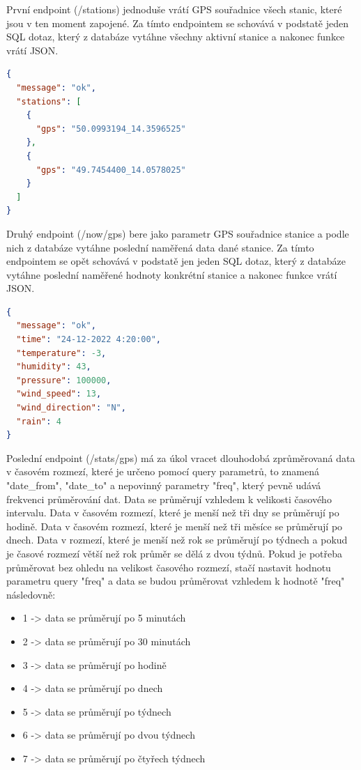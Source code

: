 První endpoint (/stations) jednoduše vrátí GPS souřadnice všech stanic, které jsou v ten moment zapojené.
Za tímto endpointem se schovává v podstatě jeden SQL dotaz, který z databáze vytáhne všechny aktivní stanice a nakonec funkce vrátí JSON.
\begin{lstlisting}[language=json,firstnumber=1, caption=Příklad požadavku /stations]
{
  "message": "ok",
  "stations": [
    {
      "gps": "50.0993194_14.3596525"
    },
    {
      "gps": "49.7454400_14.0578025"
    }
  ]
}
\end{lstlisting}
Druhý endpoint (/now/{gps}) bere jako parametr GPS souřadnice stanice a podle nich z databáze vytáhne poslední naměřená data dané stanice.
Za tímto endpointem se opět schovává v podstatě jen jeden SQL dotaz, který z databáze vytáhne poslední naměřené hodnoty konkrétní stanice a nakonec funkce vrátí JSON.
\begin{lstlisting}[language=json,firstnumber=1, caption=Příklad požadavku /now/{gps} ]
{
  "message": "ok",
  "time": "24-12-2022 4:20:00",
  "temperature": -3,
  "humidity": 43,
  "pressure": 100000,
  "wind_speed": 13,
  "wind_direction": "N",
  "rain": 4
}
\end{lstlisting}
Poslední endpoint (/stats/{gps}) má za úkol vracet dlouhodobá zprůměrovaná data v časovém rozmezí, které je určeno pomocí query parametrů,
to znamená "date\_from", "date\_to" a nepovinný parametry "freq", který pevně udává frekvenci průměrování dat. Data se průměrují vzhledem k velikosti časového intervalu.
Data v časovém rozmezí, které je menší než tři dny se průměrují po hodině.
Data v časovém rozmezí, které je menší než tři měsíce se průměrují po dnech. Data v rozmezí, které je menší než rok se průměrují po týdnech
a pokud je časové rozmezí větší než rok průměr se dělá z dvou týdnů. Pokud je potřeba průměrovat bez ohledu na velikost časového rozmezí,
stačí nastavit hodnotu parametru query "freq" a data se budou průměrovat vzhledem k hodnotě "freq" následovně:
\begin{itemize}
  \item 1 -> data se průměrují po 5 minutách
  \item 2 -> data se průměrují po 30 minutách
  \item 3 -> data se průměrují po hodině 
  \item 4 -> data se průměrují po dnech 
  \item 5 -> data se průměrují po týdnech 
  \item 6 -> data se průměrují po dvou týdnech 
  \item 7 -> data se průměrují po čtyřech týdnech 
\end{itemize}
